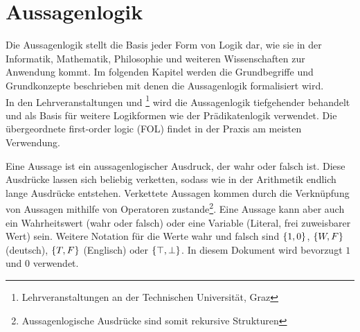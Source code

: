 \chapter{Aussagenlogik}
\label{sec:propositional_logic}
\newcommand{\BOOL}{\text{BOOL}}
\newcommand{\T}{1}
\newcommand{\F}{0}
\newcommand{\f}{f_\arabic{bfunc}}
%
%
Die Aussagenlogik stellt die Basis jeder Form von Logik dar, wie sie in der Informatik, Mathematik, Philosophie und weiteren Wissenschaften zur Anwendung kommt. Im folgenden Kapitel werden die Grundbegriffe und Grundkonzepte beschrieben mit denen die Aussagenlogik formalisiert wird. \\
In den Lehrveranstaltungen \coursedm{} und \courselc{}\footnote{Lehrveranstaltungen an der Technischen Universität, Graz} wird die Aussagenlogik tiefgehender behandelt und als Basis für weitere Logikformen wie der Prädikatenlogik verwendet. Die übergeordnete first-order logic (FOL) findet in der Praxis am meisten Verwendung.

Eine Aussage ist ein aussagenlogischer Ausdruck, der wahr oder falsch ist. Diese Ausdrücke lassen sich beliebig verketten, sodass wie in der Arithmetik endlich lange Ausdrücke entstehen. Verkettete Aussagen kommen durch die Verknüpfung von Aussagen mithilfe von Operatoren zustande\footnote{Aussagenlogische Ausdrücke sind somit rekursive Strukturen}. Eine Aussage kann aber auch ein Wahrheitswert (wahr oder falsch) oder eine Variable (Literal, frei zuweisbarer Wert) sein. Weitere Notation für die Werte wahr und falsch sind $\left\{1, 0\right\}$, $\left\{W, F\right\}$ (deutsch), $\left\{T, F\right\}$ (Englisch) oder $\left\{\top, \bot\right\}$. In diesem Dokument wird bevorzugt $\T$ und $\F$ verwendet.

